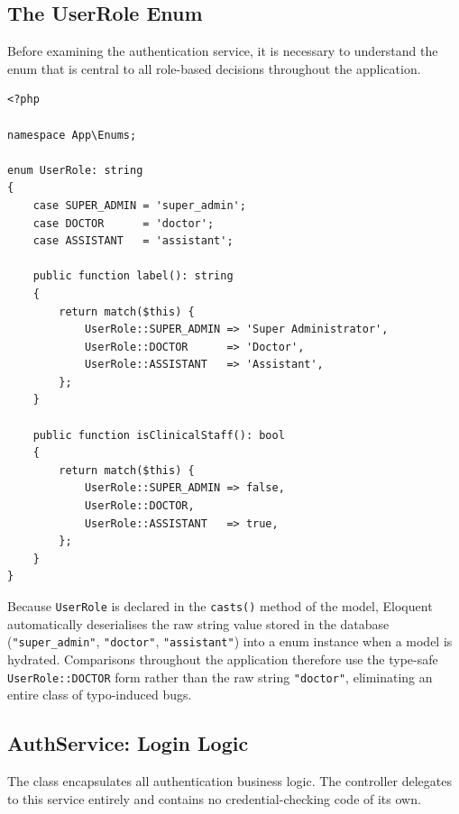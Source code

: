 \subsection{The UserRole Enum}

Before examining the authentication service, it is necessary to
understand the  enum that is central to all
role-based decisions throughout the application.

\begin{lstlisting}[style=php, caption={\texttt{app/Enums/UserRole.php} ---
  PHP 8.1 backed string enum for the three system roles.}]
<?php

namespace App\Enums;

enum UserRole: string
{
    case SUPER_ADMIN = 'super_admin';
    case DOCTOR      = 'doctor';
    case ASSISTANT   = 'assistant';

    public function label(): string
    {
        return match($this) {
            UserRole::SUPER_ADMIN => 'Super Administrator',
            UserRole::DOCTOR      => 'Doctor',
            UserRole::ASSISTANT   => 'Assistant',
        };
    }

    public function isClinicalStaff(): bool
    {
        return match($this) {
            UserRole::SUPER_ADMIN => false,
            UserRole::DOCTOR,
            UserRole::ASSISTANT   => true,
        };
    }
}
\end{lstlisting}

\begin{notebox}
  Because \texttt{UserRole} is declared in the \texttt{casts()} method
  of the  model, Eloquent automatically deserialises the
  raw string value stored in the database
  (\texttt{"super\_admin"}, \texttt{"doctor"}, \texttt{"assistant"})
  into a  enum instance when a  model
  is hydrated. Comparisons throughout the application therefore use the
  type-safe \texttt{UserRole::DOCTOR} form rather than the raw string
  \texttt{"doctor"}, eliminating an entire class of typo-induced bugs.
\end{notebox}

\subsection{AuthService: Login Logic}

The  class encapsulates all authentication
business logic. The controller delegates to this service entirely and
contains no credential-checking code of its own.


